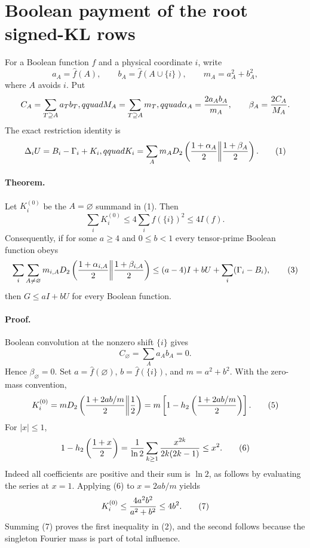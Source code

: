\section*{Boolean payment of the root signed-KL rows}

For a Boolean function $f$ and a physical coordinate $i$, write
\[
a_A=\widehat f(A),\qquad b_A=\widehat f(A\cup\{i\}),
\qquad m_A=a_A^2+b_A^2,
\]
where $A$ avoids $i$.  Put
\[
C_A=\sum_{T\supseteq A}a_Tb_T,qquad
M_A=\sum_{T\supseteq A}m_T,qquad
\alpha_A={2a_Ab_A\over m_A},\qquad
\beta_A={2C_A\over M_A}.
\]
The exact restriction identity is
\[
\Delta_iU=B_i-\Gamma_i+K_i,qquad
K_i=\sum_Am_AD_2\left({1+\alpha_A\over2}\middle\|
                       {1+\beta_A\over2}\right).     \tag{1}
\]

\paragraph{Theorem.}
Let $K_i^{(0)}$ be the $A=\varnothing$ summand in (1).  Then
\[
\boxed{\sum_iK_i^{(0)}\le4\sum_i\widehat f(\{i\})^2
                         \le4I(f).}                  \tag{2}
\]
Consequently, if for some $a\ge4$ and $0\le b<1$ every tensor-prime
Boolean function obeys
\[
\sum_i\sum_{A\ne\varnothing}m_{i,A}D_2\left(
 {1+\alpha_{i,A}\over2}\middle\|{1+\beta_{i,A}\over2}\right)
\le(a-4)I+bU+\sum_i(\Gamma_i-B_i),                   \tag{3}
\]
then $G\le aI+bU$ for every Boolean function.

\paragraph{Proof.}
Boolean convolution at the nonzero shift $\{i\}$ gives
\[
C_\varnothing=\sum_Aa_Ab_A=0.                        \tag{4}
\]
Hence $\beta_\varnothing=0$.  Set
$a=\widehat f(\varnothing)$, $b=\widehat f(\{i\})$, and
$m=a^2+b^2$.  With the zero-mass convention,
\[
K_i^{(0)}=mD_2\left({1+2ab/m\over2}\middle\|{1\over2}\right)
=m\left[1-h_2\left({1+2ab/m\over2}\right)\right].   \tag{5}
\]
For $|x|\le1$,
\[
1-h_2\left({1+x\over2}\right)
={1\over\ln2}\sum_{k\ge1}{x^{2k}\over2k(2k-1)}
\le x^2.                                             \tag{6}
\]
Indeed all coefficients are positive and their sum is $\ln2$, as follows
by evaluating the series at $x=1$.  Applying (6) to $x=2ab/m$ yields
\[
K_i^{(0)}\le {4a^2b^2\over a^2+b^2}\le4b^2.         \tag{7}
\]
Summing (7) proves the first inequality in (2), and the second follows
because the singleton Fourier mass is part of total influence.

